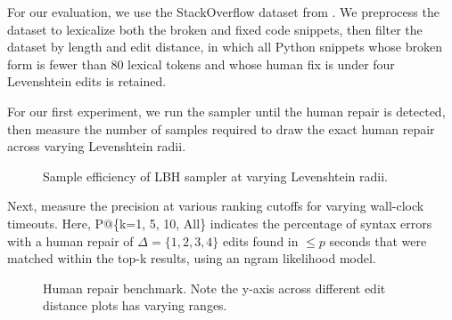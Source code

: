 \documentclass[11pt]{article}
\begin{document}
For our evaluation, we use the StackOverflow dataset from \cite{hindle2012naturalness}. We preprocess the dataset to lexicalize both the broken and fixed code snippets, then filter the dataset by length and edit distance, in which all Python snippets whose broken form is fewer than 80 lexical tokens and whose human fix is under four Levenshtein edits is retained.

For our first experiment, we run the sampler until the human repair is detected, then measure the number of samples required to draw the exact human repair across varying Levenshtein radii.

\begin{figure}[h!]
  
  \caption{Sample efficiency of LBH sampler at varying Levenshtein radii.}\label{fig:sample_efficiency}
\end{figure}

Next, measure the precision at various ranking cutoffs for varying wall-clock timeouts. Here, P@\{k=1, 5, 10, All\} indicates the percentage of syntax errors with a human repair of $\Delta=\{1, 2, 3, 4\}$ edits found in $\leq p$ seconds that were matched within the top-k results, using an ngram likelihood model.

  \begin{figure}[h!]
    \resizebox{.24\textwidth}{!}{}
    \resizebox{.24\textwidth}{!}{}
    \resizebox{.24\textwidth}{!}{}
    \resizebox{.24\textwidth}{!}{}
    \caption{Human repair benchmark. Note the y-axis across different edit distance plots has varying ranges.}\label{fig:human}
  \end{figure}

\end{document}
